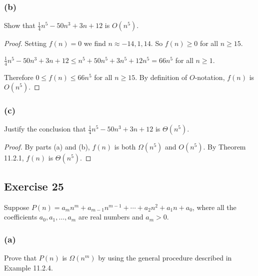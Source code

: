 \documentclass[14pt]{extarticle}
\begin{document}
\subsubsection{(b)}
Show that \(\frac{1}{4}n^5 - 50n^3 + 3n + 12\) is \(O(n^5)\).
\begin{proof}
Setting \(f(n) = 0\) we find \(n \approx -14, 1, 14\). So \(f(n) \geq 0\) for all \(n \geq 15\).

\(\frac{1}{4}n^5 - 50n^3 + 3n + 12 \leq n^5 + 50n^5 + 3n^5 + 12n^5 = 66n^5\) for all \(n \geq 1\).

Therefore \(0 \leq f(n) \leq 66n^5\) for all \(n \geq 15\). By definition of \(O\)-notation, \(f(n)\) is \(O(n^5)\).
\end{proof}

\subsubsection{(c)}
Justify the conclusion that \(\frac{1}{4}n^5 - 50n^3 + 3n + 12\) is \(\Theta(n^5)\).

\begin{proof}
By parts (a) and (b), \(f(n)\) is both \(\Omega(n^5)\) and \(O(n^5)\). By Theorem 11.2.1, \(f(n)\) is \(\Theta(n^5)\).
\end{proof}

\subsection{Exercise 25}
Suppose \(P(n) = a_mn^m + a_{m-1}n^{m-1} + \cdots + a_2n^2 + a_1n + a_0\), where all the coefficients \(a_0, a_1, \ldots, 
a_m\) are real numbers and \(a_m > 0\). 

\subsubsection{(a)}
Prove that \(P(n)\) is \(\Omega(n^m)\) by using the general procedure described in Example 11.2.4.
\end{document}
